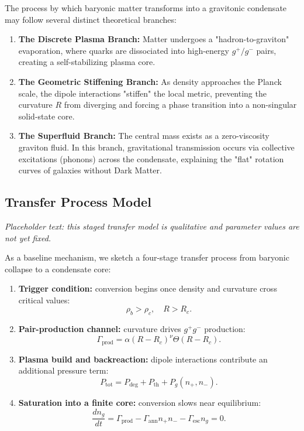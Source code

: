 \documentclass[11pt]{article}
\begin{document}
The process by which baryonic matter transforms into a gravitonic condensate may follow several distinct theoretical branches:
\begin{enumerate}
    \item \textbf{The Discrete Plasma Branch:} Matter undergoes a "hadron-to-graviton" evaporation, where quarks are dissociated into high-energy $g^+/g^-$ pairs, creating a self-stabilizing plasma core.
    \item \textbf{The Geometric Stiffening Branch:} As density approaches the Planck scale, the dipole interactions "stiffen" the local metric, preventing the curvature $R$ from diverging and forcing a phase transition into a non-singular solid-state core.
    \item \textbf{The Superfluid Branch:} The central mass exists as a zero-viscosity graviton fluid. In this branch, gravitational transmission occurs via collective excitations (phonons) across the condensate, explaining the "flat" rotation curves of galaxies without Dark Matter.
\end{enumerate}

\subsection{Transfer Process Model}
\textit{Placeholder text: this staged transfer model is qualitative and parameter values are not yet fixed.}

As a baseline mechanism, we sketch a four-stage transfer process from baryonic collapse to a condensate core:
\begin{enumerate}
    \item \textbf{Trigger condition:} conversion begins once density and curvature cross critical values:
    \[
    \rho_b > \rho_c, \quad R > R_c.
    \]
    \item \textbf{Pair-production channel:} curvature drives $g^+g^-$ production:
    \[
    \Gamma_{\mathrm{prod}} = \alpha (R - R_c)^{\nu}\Theta(R - R_c).
    \]
    \item \textbf{Plasma build and backreaction:} dipole interactions contribute an additional pressure term:
    \[
    P_{\mathrm{tot}} = P_{\mathrm{deg}} + P_{\mathrm{th}} + P_g(n_+, n_-).
    \]
    \item \textbf{Saturation into a finite core:} conversion slows near equilibrium:
    \[
    \frac{dn_g}{dt} = \Gamma_{\mathrm{prod}} - \Gamma_{\mathrm{ann}}n_+n_- - \Gamma_{\mathrm{esc}}n_g = 0.
    \]
\end{enumerate}
\end{document}

